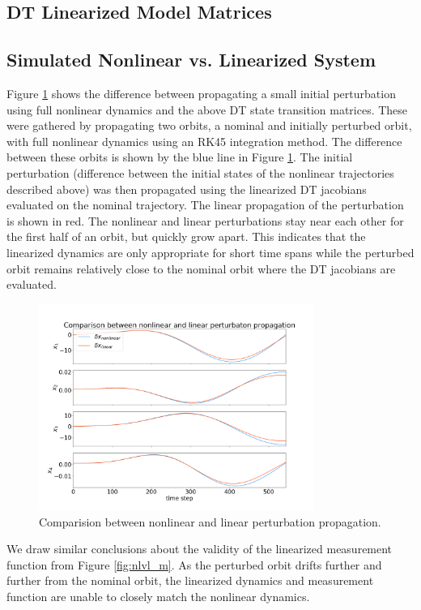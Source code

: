 \documentclass[11pt, a4paper]{article}
\begin{document}
\subsection{DT Linearized Model Matrices}

\subsection{Simulated Nonlinear vs. Linearized System}
Figure \ref{fig:nlvl_s} shows the difference between propagating a small initial perturbation using full nonlinear dynamics and the above DT state transition matrices. 
These were gathered by propagating two orbits, a nominal and initially perturbed orbit, with full nonlinear dynamics using an RK45 integration method.
The difference between these orbits is shown by the blue line in Figure \ref{fig:nlvl_s}. 
The initial perturbation (difference between the initial states of the nonlinear trajectories described above) was then propagated using the linearized DT jacobians evaluated on the nominal trajectory. 
The linear propagation of the perturbation is shown in red. 
The nonlinear and linear perturbations stay near each other for the first half of an orbit, but quickly grow apart.
This indicates that the linearized dynamics are only appropriate for short time spans while the perturbed orbit remains relatively close to the nominal orbit where the DT jacobians are evaluated. 

\begin{figure}[H]
	\centering
	\includegraphics[width=0.8\textwidth]{./Figures/nonlvl_state.png}
	\caption{Comparision between nonlinear and linear perturbation propagation.}
	\label{fig:nlvl_s}
\end{figure}

We draw similar conclusions about the validity of the linearized measurement function from Figure \ref{fig:nlvl_m}.
As the perturbed orbit drifts further and further from the nominal orbit, the linearized dynamics and measurement function are unable to closely match the nonlinear dynamics. 
\end{document}

